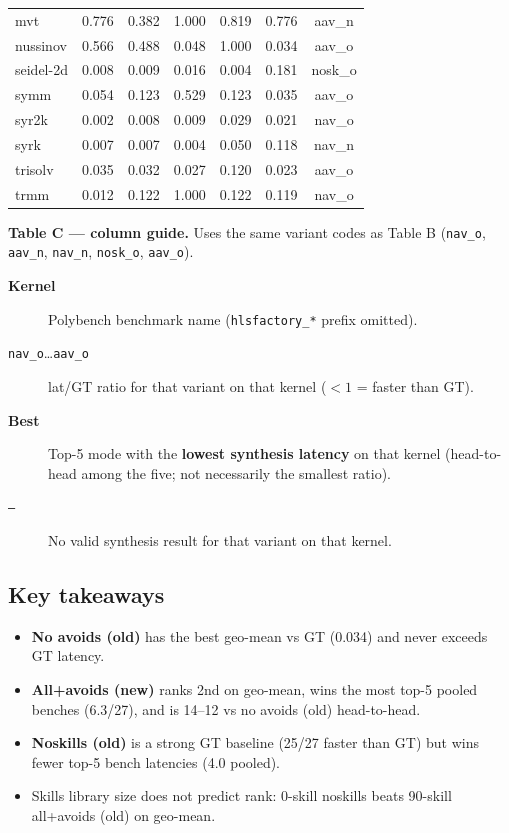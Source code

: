 \documentclass[11pt]{article}
\begin{document}
{\begin{longtable}{@{}L{1.6cm} r r r r r c@{}}
  mvt & 0.776 & 0.382 & 1.000 & 0.819 & 0.776 & aav\_n \\
  nussinov & 0.566 & 0.488 & 0.048 & 1.000 & 0.034 & aav\_o \\
  seidel-2d & 0.008 & 0.009 & 0.016 & 0.004 & 0.181 & nosk\_o \\
  symm & 0.054 & 0.123 & 0.529 & 0.123 & 0.035 & aav\_o \\
  syr2k & 0.002 & 0.008 & 0.009 & 0.029 & 0.021 & nav\_o \\
  syrk & 0.007 & 0.007 & 0.004 & 0.050 & 0.118 & nav\_n \\
  trisolv & 0.035 & 0.032 & 0.027 & 0.120 & 0.023 & aav\_o \\
  trmm & 0.012 & 0.122 & 1.000 & 0.122 & 0.119 & nav\_o \\
\bottomrule
\end{longtable}
}

\medskip
\noindent\textbf{Table C --- column guide.}
Uses the same variant codes as Table B (\texttt{nav\_o}, \texttt{aav\_n}, \texttt{nav\_n}, \texttt{nosk\_o}, \texttt{aav\_o}).
\begin{description}
  \item[\textbf{Kernel}] Polybench benchmark name (\texttt{hlsfactory\_*} prefix omitted).
  \item[\texttt{nav\_o}\ldots\texttt{aav\_o}] lat/GT ratio for that variant on that kernel ($<1$ = faster than GT).
  \item[\textbf{Best}] Top-5 mode with the \textbf{lowest synthesis latency} on that kernel (head-to-head among the five; not necessarily the smallest ratio).
  \item[\texttt{---}] No valid synthesis result for that variant on that kernel.
\end{description}

\subsection*{Key takeaways}

\begin{itemize}
  \item \textbf{No avoids (old)} has the best geo-mean vs GT (0.034) and never exceeds GT latency.
  \item \textbf{All+avoids (new)} ranks 2nd on geo-mean, wins the most top-5 pooled benches (6.3/27), and is 14--12 vs no avoids (old) head-to-head.
  \item \textbf{Noskills (old)} is a strong GT baseline (25/27 faster than GT) but wins fewer top-5 bench latencies (4.0 pooled).
  \item Skills library size does not predict rank: 0-skill noskills beats 90-skill all+avoids (old) on geo-mean.
\end{itemize}
\end{document}
